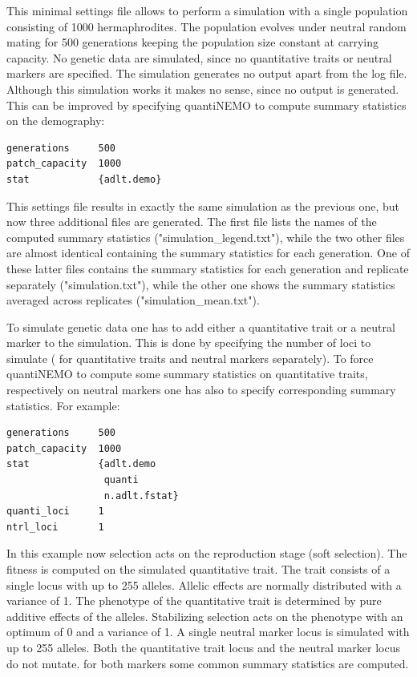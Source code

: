 \documentclass[letterpaper,12pt,oneside]{book}
\begin{document}
This minimal settings file allows to perform a simulation with a single population consisting of 1000 hermaphrodites. The population evolves under neutral random mating for 500 generations keeping the population size constant at carrying capacity. No genetic data are simulated, since no quantitative traits or neutral markers are specified. The simulation generates no output apart from the log file. Although this simulation works it makes no sense, since no output is generated. This can be improved by specifying quantiNEMO to compute summary statistics on the demography:
\begin{lstlisting}[frame=single]
generations     500
patch_capacity  1000
stat            {adlt.demo}
\end{lstlisting}
This settings file results in exactly the same simulation as the previous one, but now three additional files are generated. The first file lists the names of the computed summary statistics ("simulation\_legend.txt"), while the two other files are almost identical containing the summary statistics for each generation. One of these latter files  contains the summary statistics for each generation and replicate separately ("simulation.txt"), while the other one shows the summary statistics averaged across replicates ("simulation\_mean.txt").

To simulate genetic data one has to add either a quantitative trait or a neutral marker to the simulation. This is done by specifying the number of loci to simulate ( for quantitative traits and neutral markers separately). To force quantiNEMO to compute some summary statistics on quantitative traits, respectively on neutral markers one has also to specify corresponding summary statistics. For example:
\begin{lstlisting}[frame=single]
generations     500
patch_capacity  1000
stat            {adlt.demo 
                 quanti 
                 n.adlt.fstat}
quanti_loci     1
ntrl_loci       1      
\end{lstlisting}
In this example now selection acts on the reproduction stage (soft selection). The fitness is computed on the simulated quantitative trait. The trait consists of a single locus with up to 255 alleles. Allelic effects are normally distributed with a variance of 1. The phenotype of the quantitative trait is determined by pure additive effects of the alleles. Stabilizing selection acts on the phenotype with an optimum of 0 and a variance of 1. A single neutral marker locus is simulated with up to 255 alleles. Both the quantitative trait locus and the neutral marker locus do not mutate. for both markers some common summary statistics are computed.
\end{document}
